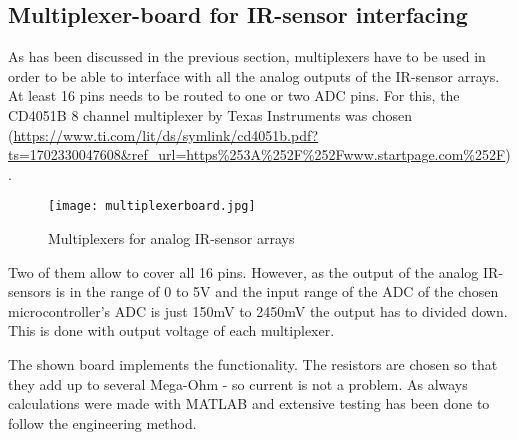 \documentclass[../report.tex]{subfiles}
\begin{document}
\subsection{Multiplexer-board for IR-sensor interfacing}
As has been discussed in the previous section, multiplexers have to be used in order to be 
able to interface with all the analog outputs of the IR-sensor arrays.
At least 16 pins needs to be routed to one or two ADC pins. For this, the CD4051B 8 channel multiplexer 
by Texas Instruments was chosen (\url{https://www.ti.com/lit/ds/symlink/cd4051b.pdf?ts=1702330047608&ref_url=https%253A%252F%252Fwww.startpage.com%252F}).

\begin{figure}[h!]
    \centering
    \texttt{[image: multiplexerboard.jpg]}
    \caption{Multiplexers for analog IR-sensor arrays}
 \end{figure}

Two of them allow to cover all 16 pins. However, as the output of the analog IR-sensors
is in the range of 0 to 5V and the input range of the ADC of the chosen microcontroller's ADC
is just 150mV to 2450mV the output has to divided down. This is done with output voltage of each
multiplexer.

The shown board implements the functionality. The resistors are chosen so that they add up to several
Mega-Ohm - so current is not a problem. As always calculations were made with MATLAB and extensive
testing has been done to follow the engineering method.
\end{document}
